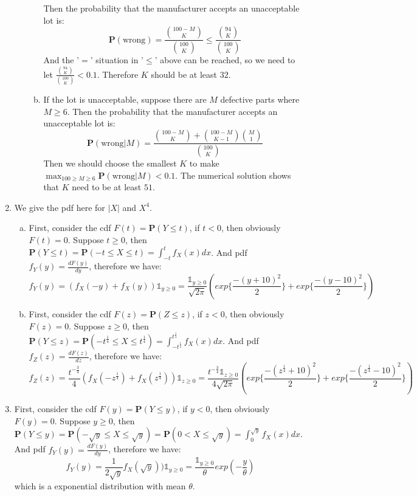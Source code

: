 \documentclass[12pt]{article}
\begin{document}
\begin{enumerate}
\begin{enumerate}[3.1]
\begin{enumerate}[(a)]
            Then the probability that the manufacturer accepts an unacceptable lot is:
            $$\textbf{P}(\text{wrong}) = \frac{\binom{100-M}{K}}{\binom{100}{K}} \le \frac{\binom{94}{K}}{\binom{100}{K}}$$
            And the '$=$' situation in '$\le$' above can be reached, so we need to let $\frac{\binom{94}{K}}{\binom{100}{K}} < 0.1$.
            Therefore $K$ should be at least $32$.
            \item
            If the lot is unacceptable, suppose there are $M$ defective parts where $M \ge 6$.
            Then the probability that the manufacturer accepts an unacceptable lot is:
            $$\textbf{P}(\text{wrong}|M) = \frac{\binom{100-M}{K}+\binom{100-M}{K-1}\binom{M}{1}}{\binom{100}{K}}$$
            Then we should choose the smallest $K$ to make $\max_{100\ge M \ge 6}\textbf{P}(\text{wrong}|M) < 0.1$.
            The numerical solution shows that $K$ need to be at least $51$.  
        \end{enumerate}
    \end{enumerate}
    \item
    We give the pdf here for $|X|$ and $X^4$.
    \begin{enumerate}[(a)]
        \item
        First, consider the cdf $F(t) = \textbf{P}(Y \le t)$, if $t < 0$, then obviously $F(t) = 0$. 
        Suppose $t \ge 0$, then $\textbf{P}(Y \le t) = \textbf{P}(-t \le X \le t) = \int_{-t}^t f_X(x) d x$. And pdf $f_Y(y) = \frac{d F(y)}{d y}$, therefore we have:
        $$f_Y(y) = (f_X(-y) + f_X(y))\mathds{1}_{y\ge 0} = \frac{\mathds{1}_{y\ge 0}}{\sqrt{2\pi}} \left(exp\{\frac{-(y+10)^2}{2}\}+exp\{\frac{-(y-10)^2}{2}\}\right)$$
        \item
        First, consider the cdf $F(z) = \textbf{P}(Z \le z)$, if $z < 0$, then obviously $F(z) = 0$. 
        Suppose $z \ge 0$, then $\textbf{P}(Y \le z) = \textbf{P}(-t^\frac{1}{4} \le X \le t^\frac{1}{4}) = \int_{-t^\frac{1}{4}}^{t^\frac{1}{4}} f_X(x) d x$. And pdf $f_Z(z) = \frac{d F(z)}{d z}$, therefore we have:
        $$f_Z(z) = \frac{t^{-\frac{3}{4}}}{4}(f_X(-z^\frac{1}{4}) + f_X(z^\frac{1}{4}))\mathds{1}_{z\ge 0} = \frac{t^{-\frac{3}{4}}\mathds{1}_{z\ge 0}}{4 \sqrt{2\pi}} \left(exp\{\frac{-(z^\frac{1}{4}+10)^2}{2}\}+exp\{\frac{-(z^\frac{1}{4}-10)^2}{2}\}\right)$$
    \end{enumerate}
    \item
    First, consider the cdf $F(y) = \textbf{P}(Y \le y)$, if $y < 0$, then obviously $F(y) = 0$. 
    Suppose $y \ge 0$, then $\textbf{P}(Y \le y) = \textbf{P}(-\sqrt{y} \le X \le \sqrt{y}) = \textbf{P}(0 < X \le \sqrt{y}) = \int_0^{\sqrt{y}} f_X(x) d x$. And pdf $f_Y(y) = \frac{d F(y)}{d y}$, therefore we have:
    $$f_Y(y) = \frac{1}{2\sqrt{y}} f_X(\sqrt{y}))\mathds{1}_{y\ge 0} = \frac{\mathds{1}_{y\ge 0}}{\theta}exp(-\frac{y}{\theta})$$
    which is a exponential distribution with mean $\theta$.
\end{enumerate}
\end{document}
